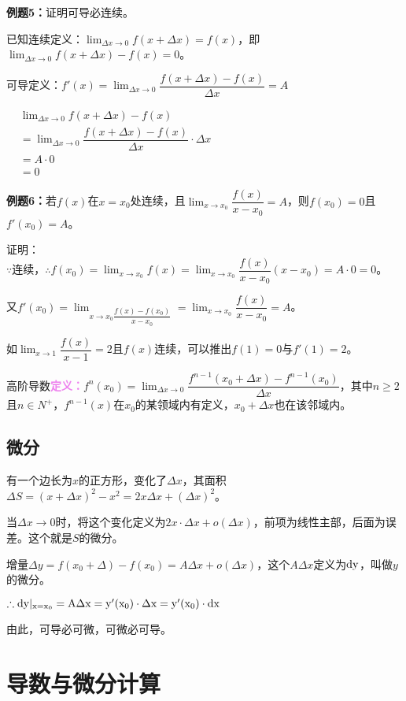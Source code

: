 \documentclass[UTF8]{ctexart}
\begin{document}
\textbf{例题5：}证明可导必连续。

已知连续定义：$\lim_{\Delta x\to 0}f(x+\Delta x)=f(x)$，即$\lim_{\Delta x\to 0}f(x+\Delta x)-f(x)=0$。

可导定义：$f'(x)=\lim_{\Delta x\to 0}\dfrac{f(x+\Delta x)-f(x)}{\Delta x} = A$

$
\begin{aligned}
    & \lim_{\Delta x\to 0}f(x+\Delta x)-f(x) \\
    & =\lim_{\Delta x\to 0}\dfrac{f(x+\Delta x)-f(x)}{\Delta x}\cdot\Delta x \\
    & =A\cdot 0 \\
    & =0
\end{aligned}
$

\textbf{例题6：}若$f(x)$在$x=x_0$处连续，且$\lim_{x\to x_0}\dfrac{f(x)}{x-x_0}=A$，则$f(x_0)=0$且$f'(x_0)=A$。

证明：$\because\text{连续，}\therefore f(x_0)=\lim_{x\to x_0}f(x)=\lim_{x\to x_0}\dfrac{f(x)}{x-x_0}(x-x_0)=A\cdot 0=0$。

又$f'(x_0)=\lim_{x\to x_0\dfrac{f(x)-f(x_0)}{x-x_0}}=\lim_{x\to x_0}\dfrac{f(x)}{x-x_0}=A$。

如$\lim_{x\to 1}\dfrac{f(x)}{x-1}=2$且$f(x)$连续，可以推出$f(1)=0$与$f'(1)=2$。

高阶导数\textcolor{violet}{\textbf{定义：}}$f^n(x_0)=\lim_{\Delta x\to 0}\dfrac{f^{n-1}(x_0+\Delta x)-f^{n-1}(x_0)}{\Delta x}$，其中$n\geqslant 2$且$n\in N^+$，$f^{n-1}(x)$在$x_0$的某领域内有定义，$x_0+\Delta x$也在该邻域内。

\subsection{微分}

有一个边长为$x$的正方形，变化了$\Delta x$，其面积$\Delta S=(x+\Delta x)^2-x^2=2x\Delta x+(\Delta x)^2$。

当$\Delta x\to 0$时，将这个变化定义为$2x\cdot\Delta x+o(\Delta x)$，前项为线性主部，后面为误差。这个就是$S$的微分。

增量$\Delta y=f(x_0+\Delta)-f(x_0)=A\Delta x+o(\Delta x)$，这个$A\Delta x$定义为$\rm{d}y$，叫做$y$的微分。

$\therefore \rm{d}y\vert_{x=x_0}=A\Delta x=y'(x_0)\cdot\Delta x=y'(x_0)\cdot\rm{d}x$

由此，可导必可微，可微必可导。

\section{导数与微分计算}
\end{document}
